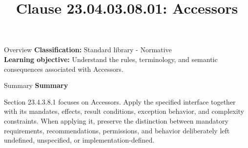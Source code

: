 \documentclass[10pt,letterpaper]{article}
\title{Clause 23.04.03.08.01: Accessors}
\author{}
\date{}
\begin{document}
\maketitle
\begin{CornellOverviewBox}{Overview}
\textbf{Classification:} Standard library - Normative\\[2pt]
\textbf{Learning objective:} Understand the rules, terminology, and semantic consequences associated with Accessors.
\end{CornellOverviewBox}\begin{CornellSummaryBox}{Summary}
{\sffamily\bfseries\color{Accent} Summary}\par\vspace{3pt}Section 23.4.3.8.1 focuses on Accessors. Apply the specified interface together with its mandates, effects, result conditions, exception behavior, and complexity constraints. When applying it, preserve the distinction between mandatory requirements, recommendations, permissions, and behavior deliberately left undefined, unspecified, or implementation-defined.
\end{CornellSummaryBox}
\end{document}
